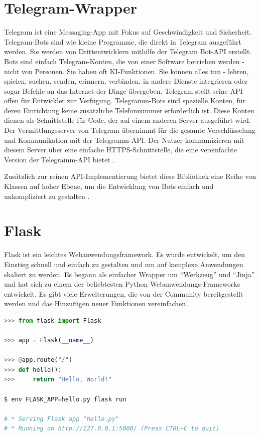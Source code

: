 \documentclass[
        ngerman,
        paper=a4,
        numbers=noendperiod,
]{scrreprt}
\begin{document}
\section{Telegram-Wrapper}
Telegram ist eine Messaging-App mit Fokus auf Geschwindigkeit und Sicherheit. Telegram-Bots sind wie kleine Programme, die direkt in Telegram ausgeführt werden. Sie werden von Drittentwicklern mithilfe der Telegram Bot-API erstellt.
Bots sind einfach Telegram-Konten, die von einer Software betrieben werden - nicht von Personen. Sie haben oft KI-Funktionen. Sie können alles tun - lehren, spielen, suchen, senden, erinnern, verbinden, in andere Dienste integrieren oder sogar Befehle an das Internet der Dinge übergeben. Telegram stellt seine API offen für Entwickler zur Verfügung. Telegramm-Bots sind spezielle Konten, für deren Einrichtung keine zusätzliche Telefonnummer erforderlich ist. Diese Konten dienen als Schnittstelle für Code, der auf einem anderen Server ausgeführt wird. Der Vermittlungsserver von Telegram übernimmt für  die gesamte Verschlüsselung und Kommunikation mit der Telegramm-API. Der Nutzer  kommunizieren mit diesem Server über eine einfache HTTPS-Schnittstelle, die eine vereinfachte Version der Telegramm-API bietet \citep{TelegramFAQ}\citep{TelegramAPIs}.

Zusätzlich zur reinen API-Implementierung bietet diese Bibliothek eine Reihe von Klassen auf hoher Ebene, um die Entwicklung von Bots einfach und unkompliziert zu gestalten \citep{Python-telegram-bot/python-telegram-bot:Refuse}.


\section{Flask}
Flask ist ein leichtes Webanwendungsframework. Es wurde entwickelt, um den Einstieg schnell und einfach zu gestalten und um auf komplexe Anwendungen skaliert zu werden. Es begann als einfacher Wrapper um \enquote{Werkzeug} und \enquote{Jinja} und hat sich zu einem der beliebtesten Python-Webanwendungs-Frameworks entwickelt. Es gibt viele Erweiterungen, die von der Community bereitgestellt werden und das Hinzufügen neuer Funktionen vereinfachen.

\begin{lstlisting}[language=Python, caption=Ein einfaches Flask Beispiel]
>>> from flask import Flask

>>> app = Flask(__name__)

>>> @app.route("/")
>>> def hello():
>>>     return "Hello, World!"

$ env FLASK_APP=hello.py flask run

# * Serving Flask app "hello.py"
# * Running on http://127.0.0.1:5000/ (Press CTRL+C to quit)
\end{lstlisting}
\end{document}
